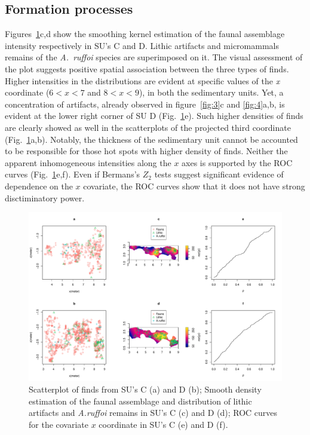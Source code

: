 \documentclass[review,authoryear]{elsarticle} %
\begin{document}
\subsection{Formation processes}

Figures~\ref{fig:5}c,d show the smoothing kernel estimation of the faunal assemblage intensity respectively in SU's C and D. Lithic artifacts and micromammals remains of the \emph{A.~ruffoi} species are superimposed on it. The visual assessment of the plot suggests positive spatial association between the three types of finds. Higher intensities in the distributions are evident at specific values of the \emph{x} coordinate ($6<x<7$ and $8<x<9$), in both the sedimentary units. Yet, a concentration of artifacts, already observed in figure~\ref{fig:3}c and \ref{fig:4}a,b, is evident at the lower right corner of SU D (Fig.~\ref{fig:5}e). Such higher densities of finds are clearly showed as well in the scatterplots of the projected third coordinate (Fig.~\ref{fig:5}a,b). Notably, the thickness of the sedimentary unit cannot be accounted to be responsible for those hot spots with higher density of finds. Neither the apparent inhomogeneous intensities along the $x$ axes is supported by the ROC curves (Fig.~\ref{fig:5}e,f). Even if Bermans's $Z_2$ tests suggest significant evidence of dependence on the $x$ covariate, the ROC curves show that it does not have strong disctiminatory power.

\begin{figure}
  \centering
  \includegraphics[width=1\textwidth]{../artwork/Fig5.pdf}
  \caption{Scatterplot of finds from SU's C (a) and D (b); Smooth density estimation of the faunal assemblage and distribution of lithic artifacts and \emph{A.ruffoi} remains in SU's C (c) and D (d); ROC curves for the covariate $x$ coordinate in SU's C (e) and D (f).}
  \label{fig:5}
\end{figure}
\end{document}
